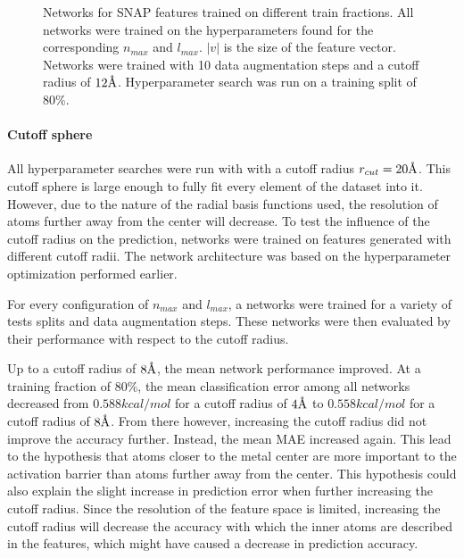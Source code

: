 \begin{figure}[!htb]
  \endminipage
  \caption[Learning curves for different SNAP resolutions]{
  Networks for SNAP features trained on different train fractions.
  All networks were trained on the hyperparameters found for the corresponding $n_{max}$ and $l_{max}$.
  $|v|$ is the size of the feature vector.
  Networks were trained with 10 data augmentation steps and a cutoff radius of $12 \AA$.
  Hyperparameter search was run on a training split of 80\%.
  }
  \label{fig:snap_hyperparameter}
\end{figure}

\paragraph{Cutoff sphere}
All hyperparameter searches were run with with a cutoff radius $r_{cut} = 20 \AA$.
This cutoff sphere is large enough to fully fit every element of the dataset into it.
However, due to the nature of the radial basis functions used, the resolution of atoms 
further away from the center will decrease.
To test the influence of the cutoff radius on the prediction, 
networks were trained on features generated with different cutoff radii.
The network architecture was based on the hyperparameter optimization performed earlier.

For every configuration of $n_{max}$ and $l_{max}$, a networks were trained for a variety 
of tests splits and data augmentation steps.
These networks were then evaluated by their performance with respect to the cutoff radius.

Up to a cutoff radius of $8 \AA$, the mean network performance improved. 
At a training fraction of 80\%, the mean classification error among 
all networks decreased from $0.588 kcal/mol$ for a cutoff radius of $4 \AA$ to 
$0.558 kcal/mol$ for a cutoff radius of $8 \AA$.
From there however, increasing the cutoff radius did not improve the accuracy further.
Instead, the mean MAE increased again.
This lead to the hypothesis that atoms closer to the metal center are more important to the activation barrier than atoms further away from the center.
This hypothesis could also explain the slight increase in prediction error when further increasing the cutoff radius.
Since the resolution of the feature space is limited, increasing the cutoff radius will decrease the accuracy 
with which the inner atoms are described in the features, which might have caused a decrease in prediction accuracy.

